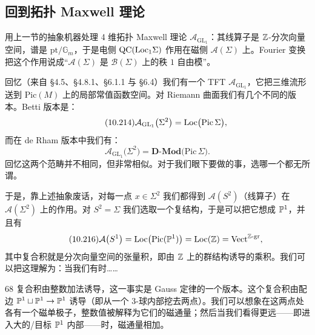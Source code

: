 
\subsection{回到拓扑 Maxwell 理论}\label{sec:10-8-4}

\begin{sectionkey}
用上一节的抽象机器处理 4 维拓扑 Maxwell 理论 $\mathcal{A}_{\mathrm{GL}_1}$：其线算子是 $\mathbb{Z}$-分次向量空间，谱是 $\mathrm{pt}/\mathbb{G}_m$，于是电侧 $\mathrm{QC}(\mathrm{Loc}_1\Sigma)$ 作用在磁侧 $\mathcal{A}(\Sigma)$ 上。Fourier 变换把这个作用说成“$\mathcal{A}(\Sigma)$ 是 $\mathcal{B}(\Sigma)$ 上的秩 $1$ 自由模”。
\end{sectionkey}

回忆（来自 \S4.5、\S4.8.1、\S6.1.1 与 \S6.4）我们有一个 TFT $\mathcal{A}_{\mathrm{GL}_1}$，它把三维流形送到 $\mathrm{Pic}(M)$ 上的局部常值函数空间。对 Riemann 曲面我们有几个不同的版本。Betti 版本是：
\begin{equation}\tag{10.214}
\mathcal{A}_{\mathrm{GL}_1}\big(\Sigma^2\big)=\mathrm{Loc}\big(\mathrm{Pic}\,\Sigma\big),
\end{equation}
而在 de Rham 版本中我们有：
\begin{equation}\tag{10.215}
\mathcal{A}_{\mathrm{GL}_1}\big(\Sigma^2\big)=\mathbf{D}\text{-}\mathbf{Mod}\big(\mathrm{Pic}\,\Sigma\big).
\end{equation}
回忆这两个范畴并不相同，但非常相似。对于我们眼下要做的事，选哪一个都无所谓。

于是，靠上述抽象废话，对每一点 $x\in\Sigma^2$ 我们都得到 $\mathcal{A}(S^2)$（线算子）在 $\mathcal{A}(\Sigma^2)$ 上的作用。对 $S^2=\Sigma$ 我们选取一个复结构，于是可以把它想成 $\mathbb{P}^1$，并且有
\begin{equation}\tag{10.216}
\mathcal{A}\big(S^1\big)=\mathrm{Loc}\big(\mathrm{Pic}(\mathbb{P}^1)\big)=\mathrm{Loc}(\mathbb{Z})=\mathrm{Vect}^{\mathbb{Z}\text{-gr}},
\end{equation}
其中复合积就是分次向量空间的张量积，即由 $\mathbb{Z}$ 上的群结构诱导的乘积。我们可以把这理解为：当我们有时……

\begin{srcrem}{68}
复合积由整数加法诱导，这一事实是 Gauss 定律的一个版本。这个复合积由配边 $\mathbb{P}^1\sqcup\mathbb{P}^1\to\mathbb{P}^1$ 诱导（即从一个 $3$-球内部挖去两点）。我们可以想象在这两点处各有一个磁单极子，整数值被解释为它们的磁通量；然后当我们看得更远——即进入大的/目标 $\mathbb{P}^1$ 内部——时，磁通量相加。
\end{srcrem}

